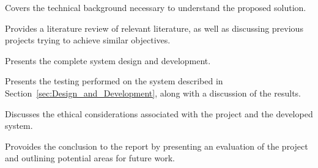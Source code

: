 \begin{description}[leftmargin=2.5cm, labelwidth=2.2cm, align=left]

    \item[Section~\ref{sec:Technical}] Covers the technical background necessary to
          understand the proposed solution.

    \item[Section~\ref{sec:Lit_Review}] Provides a literature review of relevant
          literature, as well as discussing previous projects trying to achieve similar
          objectives.

    \item[Section~\ref{sec:Design_and_Development}] Presents the complete system design and development.
    
    \item[Section~\ref{sec:Results_and_testing}] Presents the testing performed on the system described in Section~\ref{sec:Design_and_Development}, along with a discussion of the results.
    
    \item[Section~\ref{sec:Ethics}] Discusses the ethical considerations associated with the project and the developed system.
    
    \item[Section~\ref{sec: Conclusions}] Provoides the conclusion to the report by presenting an evaluation of the project and outlining potential areas for future work.

\end{description}